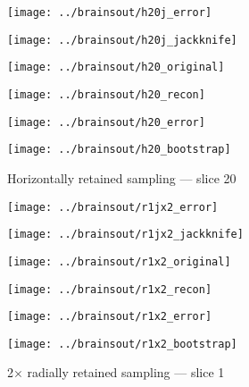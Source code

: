\documentclass[review,supplement,onefignum,onetabnum,juq]{siamonline181217}
\begin{document}
\begin{figure}
\begin{centering}

\parbox{\imsize}{\texttt{[image: ../brainsout/h20j\_error]}}
\parbox{\imsize}{\texttt{[image: ../brainsout/h20j\_jackknife]}}

\vspace{\vertsep}

\parbox{\imsize}{\texttt{[image: ../brainsout/h20\_original]}}
\parbox{\imsize}{\texttt{[image: ../brainsout/h20\_recon]}}

\vspace{\vertsep}

\parbox{\imsize}{\texttt{[image: ../brainsout/h20\_error]}}
\parbox{\imsize}{\texttt{[image: ../brainsout/h20\_bootstrap]}}

\end{centering}
\caption{Horizontally retained sampling --- slice 20}
\end{figure}


\begin{figure}
\begin{centering}

\parbox{\imsize}{\texttt{[image: ../brainsout/r1jx2\_error]}}
\parbox{\imsize}{\texttt{[image: ../brainsout/r1jx2\_jackknife]}}

\vspace{\vertsep}

\parbox{\imsize}{\texttt{[image: ../brainsout/r1x2\_original]}}
\parbox{\imsize}{\texttt{[image: ../brainsout/r1x2\_recon]}}

\vspace{\vertsep}

\parbox{\imsize}{\texttt{[image: ../brainsout/r1x2\_error]}}
\parbox{\imsize}{\texttt{[image: ../brainsout/r1x2\_bootstrap]}}

\end{centering}
\caption{2$\times$ radially retained sampling --- slice 1}
\end{figure}
\end{document}

